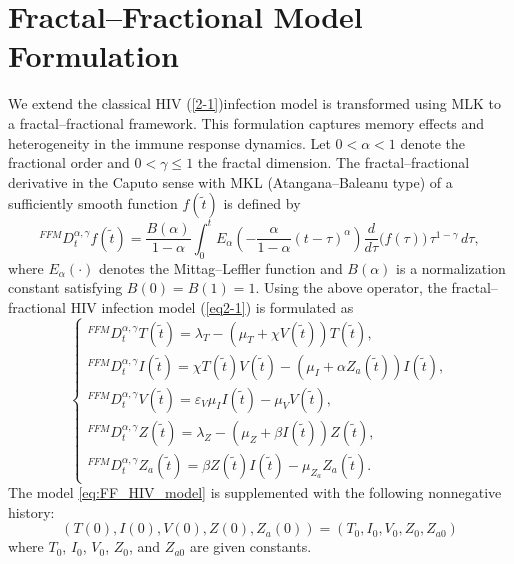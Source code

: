 \documentclass[10pt,a4paper]{amsart}
\numberwithin{equation}{section}
\begin{document}
\section{Fractal--Fractional Model Formulation}\label{sec4}
We extend the classical HIV (\ref{2-1})infection model is transformed using MLK to a fractal--fractional framework. This formulation captures memory effects and heterogeneity in the immune response dynamics.
Let $0<\alpha<1$ denote the fractional order and $0<\gamma\leq 1$ the fractal dimension. The fractal--fractional derivative in the Caputo sense with MKL (Atangana--Baleanu type) of a sufficiently smooth function $f(\tilde{t})$ is defined by
\begin{equation}
{}^{FFM}D_{t}^{\alpha,\gamma} f(\tilde{t})
=
\frac{B(\alpha)}{1-\alpha}
\int_{0}^{t}
E_{\alpha}\!\left(-\frac{\alpha}{1-\alpha}(t-\tau)^{\alpha}\right)
\frac{d}{d\tau}\big(f(\tau)\big)\,
\tau^{1-\gamma}\, d\tau,
\end{equation}
where $E_{\alpha}(\cdot)$ denotes the Mittag--Leffler function and $B(\alpha)$ is a normalization constant satisfying $B(0)=B(1)=1$.
Using the above operator, the fractal--fractional HIV infection model (\ref{eq2-1}) is formulated as
\begin{equation}
\label{eq:FF_HIV_model}
\begin{cases}
{}^{FFM}D_{t}^{\alpha,\gamma} T(\tilde{t})
= \lambda_T - (\mu_T + \chi V(\tilde{t}))T(\tilde{t}), \\[6pt]

{}^{FFM}D_{t}^{\alpha,\gamma} I(\tilde{t})
= \chi T(\tilde{t})V(\tilde{t}) - (\mu_I  + \alpha Z_{a}(\tilde{t}))I(\tilde{t}), \\[6pt]

{}^{FFM}D_{t}^{\alpha,\gamma} V(\tilde{t})
= \varepsilon_V \mu_I I(\tilde{t}) - \mu_V V(\tilde{t}), \\[6pt]

{}^{FFM}D_{t}^{\alpha,\gamma} Z(\tilde{t})
= \lambda_Z - (\mu_Z  + \beta  I(\tilde{t}))Z(\tilde{t}), \\[6pt]

{}^{FFM}D_{t}^{\alpha,\gamma} Z_{a}(\tilde{t})
= \beta Z(\tilde{t}) I(\tilde{t}) - \mu_{Z_a} Z_{a}(\tilde{t}).
\end{cases}
\end{equation}
The model \eqref{eq:FF_HIV_model} is supplemented with the following nonnegative history:
\begin{equation}\label{eq:initial}
(T(0),I(0),V(0),Z(0), Z_a(0) )=(T_0,I_0,V_0,Z_0,Z_{a0} )
\end{equation}
where $T_0$, $I_0$, $V_0$, $Z_0$, and $Z_{a0}$ are given constants.
\end{document}
